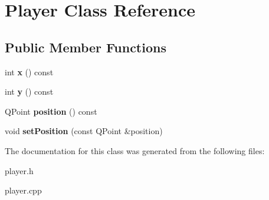 \hypertarget{class_player}{}\section{Player Class Reference}
\label{class_player}
\subsection*{Public Member Functions}
\begin{DoxyCompactItemize}
\item 
\hypertarget{class_player_aec42418e6902f7cfdaedf99084dd7b18}{}int {\bfseries x} () const \label{class_player_aec42418e6902f7cfdaedf99084dd7b18}

\item 
\hypertarget{class_player_a0dacc87d64c6a6ced94e967be0ed5542}{}int {\bfseries y} () const \label{class_player_a0dacc87d64c6a6ced94e967be0ed5542}

\item 
\hypertarget{class_player_a68af26bb89f249cc6f7c51081dd3d2bf}{}Q\+Point {\bfseries position} () const \label{class_player_a68af26bb89f249cc6f7c51081dd3d2bf}

\item 
\hypertarget{class_player_a4dc924d0cbade72ad6c43f8d5abd61b5}{}void {\bfseries set\+Position} (const Q\+Point \&position)\label{class_player_a4dc924d0cbade72ad6c43f8d5abd61b5}

\end{DoxyCompactItemize}


The documentation for this class was generated from the following files\+:\begin{DoxyCompactItemize}
\item 
player.\+h\item 
player.\+cpp\end{DoxyCompactItemize}
